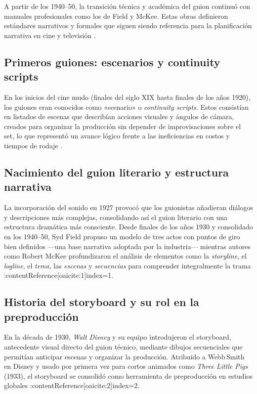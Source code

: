 \documentclass[12pt]{article}
\begin{document}
	\hspace{1.27cm}A partir de los 1940–50, la transición técnica y académica del guion continuó con manuales profesionales como los de Field y McKee. Estas obras definieron estándares narrativos y formales que siguen siendo referencia para la planificación narrativa en cine y televisión \parencite{screenplayology_history,newyorker_mckee}.

	\subsection{Primeros guiones: escenarios y continuity scripts}
	En los inicios del cine mudo (finales del siglo XIX hasta finales de los años 1920), los guiones eran conocidos como «scenario» o \textit{continuity scripts}. Estos consistían en listados de escenas que describían acciones visuales y ángulos de cámara, creados para organizar la producción sin depender de improvisaciones sobre el set, lo que representó un avance lógico frente a las ineficiencias en costos y tiempos de rodaje \parencite{thescriptlab_history,screenplayology_history,wcftr_continuity}.

	\subsection{Nacimiento del guion literario y estructura narrativa}
	La incorporación del sonido en 1927 provocó que los guionistas añadieran diálogos y descripciones más complejas, consolidando así el guion literario con una estructura dramática más consciente. Desde finales de los años 1930 y consolidado en los 1940–50, Syd Field propuso un modelo de tres actos con puntos de giro bien definidos —una base narrativa adoptada por la industria— mientras autores como Robert McKee profundizaron el análisis de elementos como la \textit{storyline}, el \textit{logline}, el \textit{tema}, las \textit{escenas} y \textit{secuencias} para comprender integralmente la trama :contentReference[oaicite:1]{index=1}.

	\subsection{Historia del storyboard y su rol en la preproducción}
	En la década de 1930, \textit{Walt Disney} y su equipo introdujeron el storyboard, antecedente visual directo del guion técnico, mediante dibujos secuenciales que permitían anticipar escenas y organizar la producción. Atribuido a Webb Smith en Disney y usado por primera vez para cortos animados como \textit{Three Little Pigs} (1933), el storyboard se consolidó como herramienta de preproducción en estudios globales :contentReference[oaicite:2]{index=2}.
\end{document}
